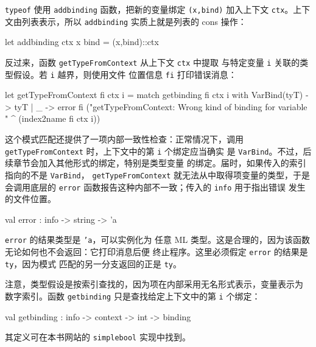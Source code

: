 \texttt{typeof} 使用 \texttt{addbinding} 函数，把新的变量绑定
\texttt{(x,bind)} 加入上下文 \texttt{ctx}。上下文由列表表示，所以
\texttt{addbinding} 实质上就是列表的 cons 操作：
\begin{taplocamlcode}
let addbinding ctx x bind = (x,bind)::ctx
\end{taplocamlcode}

反过来，函数 \texttt{getTypeFromContext} 从上下文 \texttt{ctx} 中提取
与特定变量 \texttt{i} 关联的类型假设。若 \texttt{i} 越界，则使用文件
位置信息 \texttt{fi} 打印错误消息：
\begin{taplocamlcode}
let getTypeFromContext fi ctx i =
  match getbinding fi ctx i with
      VarBind(tyT) -> tyT
    | _ -> error fi
      ("getTypeFromContext: Wrong kind of binding for variable "
      ^ (index2name fi ctx i))
\end{taplocamlcode}

这个模式匹配还提供了一项内部一致性检查：正常情况下，调用
\texttt{getTypeFromContext} 时，上下文中的第 \texttt{i} 个绑定应当确实
是 \texttt{VarBind}。不过，后续章节会加入其他形式的绑定，特别是类型变量
的绑定。届时，如果传入的索引指向的不是 \texttt{VarBind}，
\texttt{getTypeFromContext} 就无法从中取得项变量的类型，于是会调用底层的
\texttt{error} 函数报告这种内部不一致；传入的 \texttt{info} 用于指出错误
发生的文件位置。
\begin{taplocamlcode}
val error : info -> string -> 'a
\end{taplocamlcode}

\texttt{error} 的结果类型是 \texttt{'a}，可以实例化为
任意 ML 类型。这是合理的，因为该函数无论如何也不会返回：它打印消息后便
终止程序。这里必须假定 \texttt{error} 的结果是 \texttt{ty}，因为模式
匹配的另一分支返回的正是 \texttt{ty}。


注意，类型假设是按索引查找的，因为项在内部采用无名形式表示，变量表示为
数字索引。函数 \texttt{getbinding} 只是查找给定上下文中的第
\texttt{i} 个绑定：
\begin{taplocamlcode}
val getbinding : info -> context -> int -> binding
\end{taplocamlcode}
其定义可在本书网站的 \texttt{simplebool} 实现中找到。

